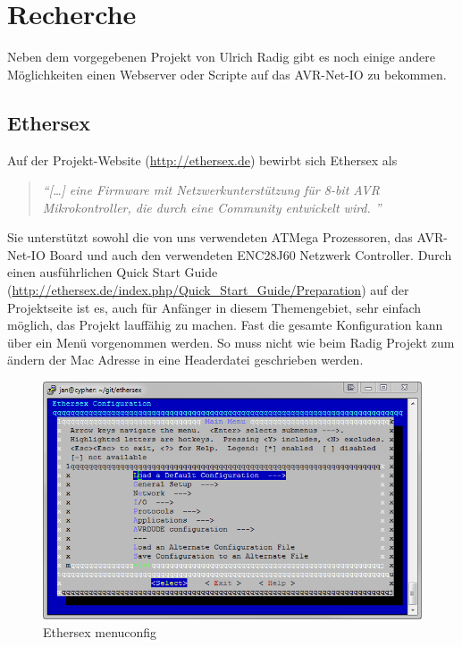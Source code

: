 \chapter{Recherche}

Neben dem vorgegebenen Projekt von Ulrich Radig gibt es noch einige andere
Möglichkeiten einen Webserver oder Scripte auf das AVR-Net-IO zu bekommen.

\section{Ethersex}

Auf der Projekt-Website (\url{http://ethersex.de}) bewirbt sich Ethersex als
\begin{quote} \textit{
		\enquote{[\ldots] eine Firmware mit Netzwerkunterstützung für 8-bit AVR
		Mikrokontroller, die durch eine Community entwickelt wird.  }
	}
	\cite{Ethersex}
\end{quote}

Sie unterstützt sowohl die von uns verwendeten ATMega Prozessoren, das
AVR-Net-IO Board und auch den verwendeten ENC28J60 Netzwerk Controller.
Durch einen ausführlichen Quick Start Guide
(\url{http://ethersex.de/index.php/Quick_Start_Guide/Preparation}) auf der
Projektseite ist es, auch für Anfänger in diesem Themengebiet, sehr einfach möglich, das Projekt lauffähig zu machen. 
Fast die gesamte Konfiguration kann über ein Menü vorgenommen werden. So muss nicht wie beim Radig Projekt zum
ändern der Mac Adresse in eine Headerdatei geschrieben werden. 

\begin{figure}[H]
	\centering
		\includegraphics[width=13cm]{content/pictures/Recherche/Ethersex/Ehtersex1.png}
	\caption{Ethersex menuconfig}
	\label{Ethersex1}
\end{figure} 

